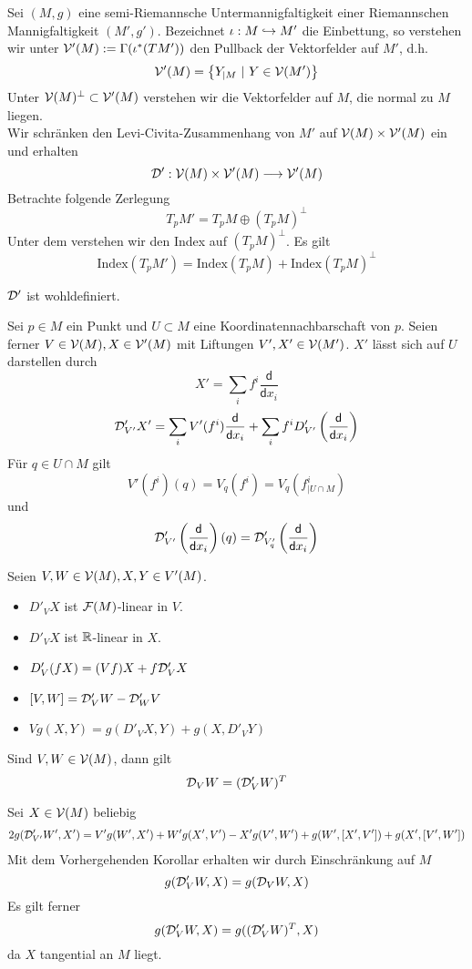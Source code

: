 \documentclass{book}
\renewcommand{\d}{\textsf{d}}
\begin{document}
\Def{}
Sei $(M,g)$ eine semi-Riemannsche Untermannigfaltigkeit einer Riemannschen Mannigfaltigkeit $(M',g')$. Bezeichnet $\iota : M \overset{}{\hookrightarrow} M'$ die Einbettung, so verstehen wir unter $\mathcal{V}'(M) := \Gamma(\iota^*(TM'))$ den Pullback der Vektorfelder auf $M'$, d.h.
\[ \V'(M) = \set{Y_{|M}}{Y \in \V(M')} \]
Unter $\mathcal{V}(M)^\bot \subset \mathcal{V}'(M)$ verstehen wir die Vektorfelder auf $M$, die normal zu $M$ liegen.\\
Wir schränken den Levi-Civita-Zusammenhang von $M'$ auf $\mathcal{V}(M) \times \mathcal{V}'(M)$ ein und erhalten
\[ \mathcal{D}' : \mathcal{V}(M) \times \mathcal{V}'(M) \overset{}{\longrightarrow} \mathcal{V}'(M) \]
Betrachte folgende Zerlegung
\[ T_pM' = T_pM \oplus (T_pM)^\bot \]
Unter dem  verstehen wir den Index auf $(T_pM)^\bot$. Es gilt
\[ \text{Index}(T_pM') = \text{Index}(T_pM) + \text{Index}(T_pM)^\bot \]

\Lem{}
$\mathcal{D}'$ ist wohldefiniert.
\begin{Beweis}{}
Sei $p \in M$ ein Punkt und $U \subset M$ eine Koordinatennachbarschaft von $p$. Seien ferner $V \in \mathcal{V}(M), X \in \mathcal{V}'(M)$ mit Liftungen $V',X' \in \mathcal{V}(M')$. $X'$ lässt sich auf $U$ darstellen durch
\[ X' = \sum_{i} f^i \frac{\d}{\d x_i} \]
\[ \D'_{V'}X' = \sum_i V'(f^i) \frac{\d}{\d x_i} + \sum_i f^i D'_{V'}\klam{\frac{\d}{\d x_i}} \]
Für $q \in U\cap M$ gilt
\[V'(f^i)(q) = V_q(f^i) = V_q(f^i_{|U\cap M}) \]
und
\[ \D'_{V'}\klam{\frac{\d}{\d x_i}}(q) = \D'_{V'_q}\klam{\frac{\d}{\d x_i}} \]
\end{Beweis}
\Kor{}
Seien $V,W \in \mathcal{V}(M), X,Y \in V'(M)$.
\begin{itemize}
\item $D'_VX$ ist $\mathcal{F}(M)$-linear in $V$.
\item $D'_VX$ ist $\mathbb{R}$-linear in $X$.
\item $D'_V(fX) = (Vf) X + f\mathcal{D}'_VX$
\item $[V,W] = \mathcal{D}'_VW - \mathcal{D}'_WV$
\item $Vg(X,Y) = g(D'_VX, Y) + g(X, D'_VY)$
\end{itemize}
\Lem{}
Sind $V,W \in \mathcal{V}(M)$, dann gilt
\[ \mathcal{D}_VW = (\mathcal{D}'_VW)^T \]
\begin{Beweis}{}
Sei $X \in \mathcal{V}(M)$ beliebig
\begin{align*}
2g(\mathcal{D}'_{V'}W', X') = V'g(W',X') + W'g(X',V') - X'g(V',W') + g(W',[X',V']) + g(X', [V',W'])
\end{align*}
Mit dem Vorhergehenden Korollar erhalten wir durch Einschränkung auf $M$
\[ g(\mathcal{D}'_{V}W, X) = g(\mathcal{D}_{V}W, X) \]
Es gilt ferner
\[ g(\mathcal{D}'_{V}W, X) = g((\mathcal{D}'_{V}W)^T, X) \]
da $X$ tangential an $M$ liegt.
\end{Beweis}
\end{document}

